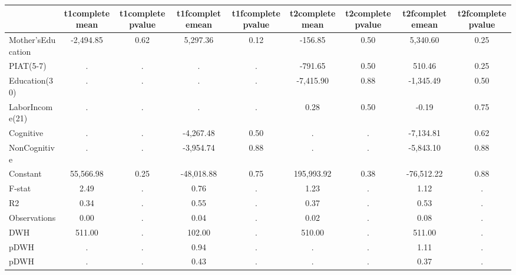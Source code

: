 \begin{table}[htbp]
\begin{tabular}{lcccccccc} \hline \hline
 & t1completemean  & t1completepvalue  & t1fcompletemean  & t1fcompletepvalue  & t2completemean  & t2completepvalue  & t2fcompletemean  & t2fcompletepvalue  \\  \hline 
Mother'sEducation &    -2,494.85 &         0.62 &     5,297.36 &         0.12 &      -156.85 &         0.50 &     5,340.60 &         0.25 \\  
PIAT(5-7) &            . &            . &            . &            . &      -791.65 &         0.50 &       510.46 &         0.25 \\  
Education(30) &            . &            . &            . &            . &    -7,415.90 &         0.88 &    -1,345.49 &         0.50 \\  
LaborIncome(21) &            . &            . &            . &            . &         0.28 &         0.50 &        -0.19 &         0.75 \\  
Cognitive &            . &            . &    -4,267.48 &         0.50 &            . &            . &    -7,134.81 &         0.62 \\  
NonCognitive &            . &            . &    -3,954.74 &         0.88 &            . &            . &    -5,843.10 &         0.88 \\  
Constant &    55,566.98 &         0.25 &   -48,018.88 &         0.75 &   195,993.92 &         0.38 &   -76,512.22 &         0.88 \\  
F-stat &         2.49 &            . &         0.76 &            . &         1.23 &            . &         1.12 &            . \\  
R2 &         0.34 &            . &         0.55 &            . &         0.37 &            . &         0.53 &            . \\  
Observations &         0.00 &            . &         0.04 &            . &         0.02 &            . &         0.08 &            . \\  
DWH &       511.00 &            . &       102.00 &            . &       510.00 &            . &       511.00 &            . \\  
pDWH &            . &            . &         0.94 &            . &            . &            . &         1.11 &            . \\  
pDWH &            . &            . &         0.43 &            . &            . &            . &         0.37 &            . \\  
\hline \hline \end{tabular}
\end{table}
